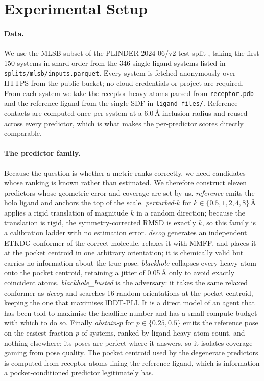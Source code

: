 \documentclass{article} %
\begin{document}
\section{Experimental Setup}
\label{sec:experimental}
\paragraph{Data.} We use the MLSB subset of the PLINDER 2024-06/v2 test split
\citep{durairaj-2024-plinder}, taking the first 150 systems in shard order from the 346
single-ligand systems listed in \texttt{splits/mlsb/inputs.parquet}. Every system is
fetched anonymously over HTTPS from the public bucket; no cloud credentials or project
are required. From each system we take the receptor heavy atoms parsed from
\texttt{receptor.pdb} and the reference ligand from the single SDF in
\texttt{ligand\_files/}. Reference contacts are computed once per system at a 6.0\,\AA{}
inclusion radius and reused across every predictor, which is what makes the per-predictor
scores directly comparable.

\paragraph{The predictor family.} Because the question is whether a metric ranks
correctly, we need candidates whose ranking is known rather than estimated. We therefore
construct eleven predictors whose geometric error and coverage are set by us.
\emph{reference} emits the holo ligand and anchors the top of the scale.
\emph{perturbed-$k$} for $k \in \{0.5, 1, 2, 4, 8\}$\,\AA{} applies a rigid translation
of magnitude $k$ in a random direction; because the translation is rigid, the
symmetry-corrected RMSD is exactly $k$, so this family is a calibration ladder with no
estimation error. \emph{decoy} generates an independent ETKDG conformer of the correct
molecule, relaxes it with MMFF, and places it at the pocket centroid in one arbitrary
orientation; it is chemically valid but carries no information about the true pose.
\emph{blackhole} collapses every heavy atom onto the pocket centroid, retaining a
jitter of 0.05\,\AA{} only to avoid exactly coincident atoms. \emph{blackhole\_busted}
is the adversary: it takes the same relaxed conformer as \emph{decoy} and searches 16
random orientations at the pocket centroid, keeping the one that maximises lDDT-PLI. It
is a direct model of an agent that has been told to maximise the headline number and has
a small compute budget with which to do so. Finally \emph{abstain-$p$} for
$p \in \{0.25, 0.5\}$ emits the reference pose on the easiest fraction $p$ of systems,
ranked by ligand heavy-atom count, and nothing elsewhere; its poses are perfect where it
answers, so it isolates coverage gaming from pose quality. The pocket centroid used by
the degenerate predictors is computed from receptor atoms lining the reference ligand,
which is information a pocket-conditioned predictor legitimately has.
\end{document}
